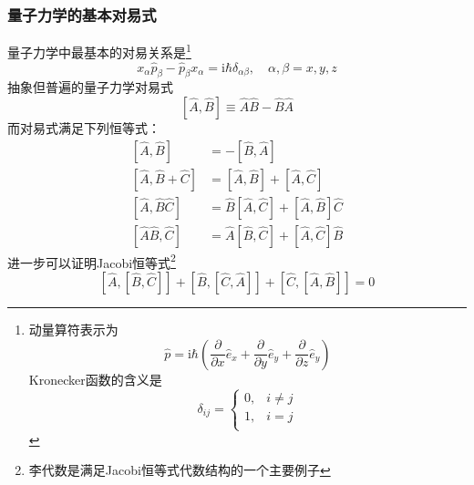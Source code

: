 \subsubsection{量子力学的基本对易式}
量子力学中最基本的对易关系是\footnote{
    动量算符表示为
    $$
        \hat{p} = \mathrm{i}\hbar\left( \frac{\partial }{\partial x}\hat{e}_x + \frac{\partial }{\partial y}\hat{e}_y + \frac{\partial }{\partial z}\hat{e}_y \right)
    $$
    Kronecker函数的含义是
    $$
        \delta_{ij}=\begin{cases}
            0, & i \neq j \\
            1, & i = j    \\
        \end{cases}
    $$
}
$$
    x_{\alpha}\hat{p}_{\beta}-\hat{p}_{\beta}x_{\alpha}=\mathrm{i}\hbar\delta_{\alpha\beta}, \quad \alpha,\beta=x,y,z
$$
抽象但普遍的量子力学对易式
\begin{equation}
    \left[\hat{A}, \hat{B}\right] \equiv \hat{A}\hat{B}-\hat{B}\hat{A}
\end{equation}
而对易式满足下列恒等式：
\begin{align}
    \left[\hat{A}, \hat{B}\right]         & = -\left[\hat{B}, \hat{A}\right]                                              \\
    \left[\hat{A}, \hat{B}+\hat{C}\right] & = \left[\hat{A}, \hat{B}\right] + \left[\hat{A}, \hat{C}\right]               \\
    \left[\hat{A}, \hat{B}\hat{C}\right]  & = \hat{B}\left[\hat{A}, \hat{C}\right] + \left[\hat{A}, \hat{B}\right]\hat{C} \\
    \left[\hat{A}\hat{B}, \hat{C}\right]  & = \hat{A}\left[\hat{B}, \hat{C}\right] + \left[\hat{A}, \hat{C}\right]\hat{B}
\end{align}
进一步可以证明Jacobi恒等式\footnote{李代数是满足Jacobi恒等式代数结构的一个主要例子}
\begin{equation}
    \left[\hat{A}, \left[\hat{B},\hat{C}\right]\right] + \left[\hat{B}, \left[\hat{C},\hat{A}\right]\right] + \left[\hat{C}, \left[\hat{A},\hat{B}\right]\right] = 0
\end{equation}



